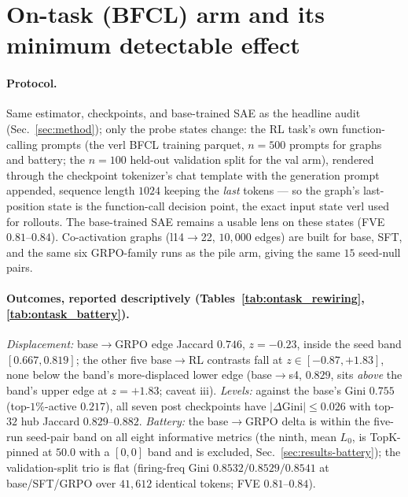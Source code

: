 \documentclass{article}
\begin{document}
\section{On-task (BFCL) arm and its minimum detectable effect}
\label{app:ontask}

\paragraph{Protocol.} Same estimator, checkpoints, and base-trained SAE as the headline audit (Sec.~\ref{sec:method}); only the probe states change: the RL task's own function-calling prompts (the verl BFCL training parquet, $n{=}500$ prompts for graphs and battery; the $n{=}100$ held-out validation split for the val arm), rendered through the checkpoint tokenizer's chat template with the generation prompt appended, sequence length $1024$ keeping the \emph{last} tokens --- so the graph's last-position state is the function-call decision point, the exact input state verl used for rollouts. The base-trained SAE remains a usable lens on these states (FVE $0.81$--$0.84$). Co-activation graphs (l14$\to$22, $10{,}000$ edges) are built for base, SFT, and the same six GRPO-family runs as the pile arm, giving the same $15$ seed-null pairs.

\paragraph{Outcomes, reported descriptively (Tables~\ref{tab:ontask_rewiring}, \ref{tab:ontask_battery}).} \emph{Displacement:} base$\to$GRPO edge Jaccard $0.746$, $z=-0.23$, inside the seed band $[0.667,0.819]$; the other five base$\to$RL contrasts fall at $z\in[-0.87,+1.83]$, none below the band's more-displaced lower edge (base$\to$s4, $0.829$, sits \emph{above} the band's upper edge at $z=+1.83$; caveat iii). \emph{Levels:} against the base's Gini $0.755$ (top-$1\%$-active $0.217$), all seven post checkpoints have $|\Delta\text{Gini}|\le0.026$ with top-$32$ hub Jaccard $0.829$--$0.882$. \emph{Battery:} the base$\to$GRPO delta is within the five-run seed-pair band on all eight informative metrics (the ninth, mean $L_0$, is TopK-pinned at $50.0$ with a $[0,0]$ band and is excluded, Sec.~\ref{sec:results-battery}); the validation-split trio is flat (firing-freq Gini $0.8532/0.8529/0.8541$ at base/SFT/GRPO over $41{,}612$ identical tokens; FVE $0.81$--$0.84$).
\end{document}
